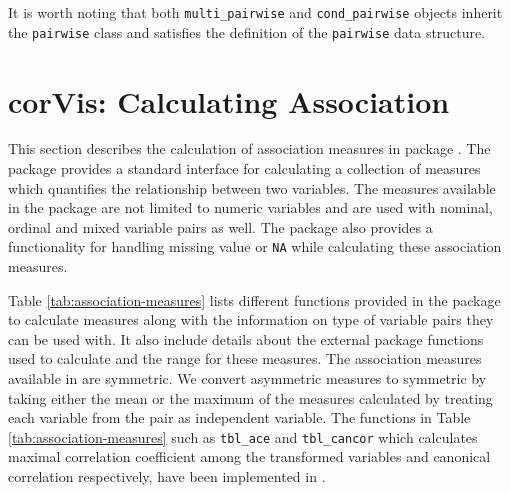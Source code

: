 It is worth noting that both \texttt{multi\_pairwise} and \texttt{cond\_pairwise} objects inherit the \texttt{pairwise} class and satisfies the definition of the \texttt{pairwise} data structure.

\hypertarget{corvis-calculating-association}{%
\section{corVis: Calculating Association}\label{corvis-calculating-association}}

This section describes the calculation of association measures in package . The package provides a standard interface for calculating a collection of measures which quantifies the relationship between two variables. The measures available in the package are not limited to numeric variables and are used with nominal, ordinal and mixed variable pairs as well. The package also provides a functionality for handling missing value or \texttt{NA} while calculating these association measures.

Table \ref{tab:association-measures} lists different functions provided in the package to calculate measures along with the information on type of variable pairs they can be used with. It also include details about the external package functions used to calculate and the range for these measures. The association measures available in  are symmetric. We convert asymmetric measures to symmetric by taking either the mean or the maximum of the measures calculated by treating each variable from the pair as independent variable. The functions in Table \ref{tab:association-measures} such as \texttt{tbl\_ace} and \texttt{tbl\_cancor} which calculates maximal correlation coefficient among the transformed variables and canonical correlation respectively, have been implemented in .

